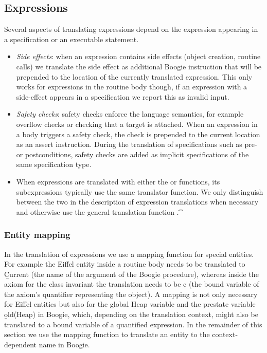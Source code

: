 \subsection{Expressions}

Several aspects of translating expressions depend on the expression appearing in a specification or an executable statement.
\begin{itemize}
\item
\emph{Side effects}: when an expression contains side effects (object creation, routine calls) we translate the side effect as additional Boogie instruction that will be prepended to the location of the currently translated expression. This only works for expressions in the routine body though, if an expression with a side-effect appears in a specification we report this as invalid input.
\item
\emph{Safety checks}: safety checks enforce the language semantics, for example overflow checks or checking that a target is attached. When an expression in a body triggers a safety check, the check is prepended to the current location as an assert instruction. During the translation of specifications such as pre- or postconditions, safety checks are added as implicit specifications of the same specification type.
\item
When expressions are translated with either the  or  functions, its subexpressions typically use the same translator function. We only distinguish between the two in the description of expression translations when necessary and otherwise use the general translation function \t.
\end{itemize}


\subsubsection{Entity mapping}

In the translation of expressions we use a mapping function for special entities. For example the Eiffel  entity inside a routine body needs to be translated to \b{Current} (the name of the argument of the Boogie procedure), whereas inside the axiom for the class invariant the translation needs to be \b{c} (the bound variable of the axiom's quantifier representing the  object). A mapping is not only necessary for Eiffel entities but also for the global \b{Heap} variable and the prestate variable \b{old(Heap)} in Boogie, which, depending on the translation context, might also be translated to a bound variable of a quantified expression. In the remainder of this section we use the mapping function \m to translate an entity to the context-dependent name in Boogie.


